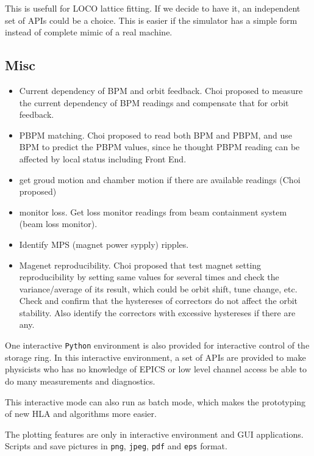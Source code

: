 \documentclass[letterpaper,showtrims]{memoir}
\newcommand{\code}[1]{\texttt{#1}}
\begin{document}
This is usefull for LOCO lattice fitting. If we decide to have it, an
independent set of APIs could be a choice. This is easier if the
simulator has a simple form instead of complete mimic of a real machine.

\subsection{Misc}

\begin{itemize} %
\item Current dependency of BPM and orbit feedback. Choi proposed to
  measure the current dependency of BPM readings and compensate that for
  orbit feedback.
\item PBPM matching. Choi proposed to read both BPM and PBPM, and use BPM
  to predict the PBPM values, since he thought PBPM reading can be
  affected by local status including Front End.
\item get groud motion and chamber motion if there are available readings
  (Choi proposed)
\item monitor loss. Get loss monitor readings from beam containment system
  (beam loss monitor).
\item Identify MPS (magnet power sypply) ripples.
\item Magenet reproducibility. Choi proposed that test magnet setting
  reproducibility by setting same values for several times and check the
  variance/average of its result, which could be orbit shift, tune change,
  etc. Check and confirm that the hystereses of correctors do not affect
  the orbit stability. Also identify the correctors with excessive
  hystereses if there are any.
\end{itemize}

One interactive \code{Python} environment is also provided for
interactive control of the storage ring. In this interactive
environment, a set of APIs are provided to make physicists who has no
knowledge of EPICS or low level channel access be able to do many
measurements and diagnostics.

This interactive mode can also run as batch mode, which makes the
prototyping of new HLA and algorithms more easier.

The plotting features are only in interactive environment and GUI
applications. Scripts and save pictures in \code{png}, \code{jpeg},
\code{pdf} and \code{eps} format.
\end{document}

